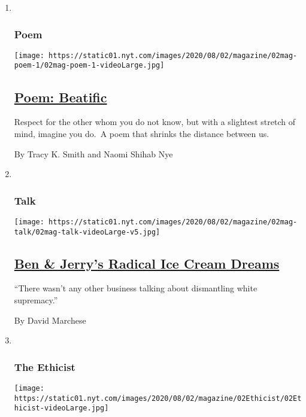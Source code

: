 \begin{enumerate}
\def\labelenumi{\arabic{enumi}.}
\item ~
  \hypertarget{poem}{%
  \subsubsection{Poem}\label{poem}}

  \texttt{[image: https://static01.nyt.com/images/2020/08/02/magazine/02mag-poem-1/02mag-poem-1-videoLarge.jpg]}

  \hypertarget{poem-beatific}{%
  \subsection{\texorpdfstring{\href{/2020/07/30/magazine/poem-beatific.html}{Poem:
  Beatific}}{Poem: Beatific}}\label{poem-beatific}}

  Respect for the other whom you do not know, but with a slightest
  stretch of mind, imagine you do.~A poem that shrinks the distance
  between us.

  By Tracy K. Smith and Naomi Shihab Nye
\item ~
  \hypertarget{talk}{%
  \subsubsection{Talk}\label{talk}}

  \texttt{[image: https://static01.nyt.com/images/2020/08/02/magazine/02mag-talk/02mag-talk-videoLarge-v5.jpg]}

  \hypertarget{ben--jerrys-radical-ice-cream-dreams}{%
  \subsection{\texorpdfstring{\href{/interactive/2020/07/27/magazine/ben-jerry-interview.html}{Ben
  \& Jerry's Radical Ice Cream
  Dreams}}{Ben \& Jerry's Radical Ice Cream Dreams}}\label{ben--jerrys-radical-ice-cream-dreams}}

  ``There wasn't any other business talking about dismantling white
  supremacy.''

  By David Marchese
\item ~
  \hypertarget{the-ethicist}{%
  \subsubsection{The Ethicist}\label{the-ethicist}}

  \texttt{[image: https://static01.nyt.com/images/2020/08/02/magazine/02Ethicist/02Ethicist-videoLarge.jpg]}


\end{enumerate}
